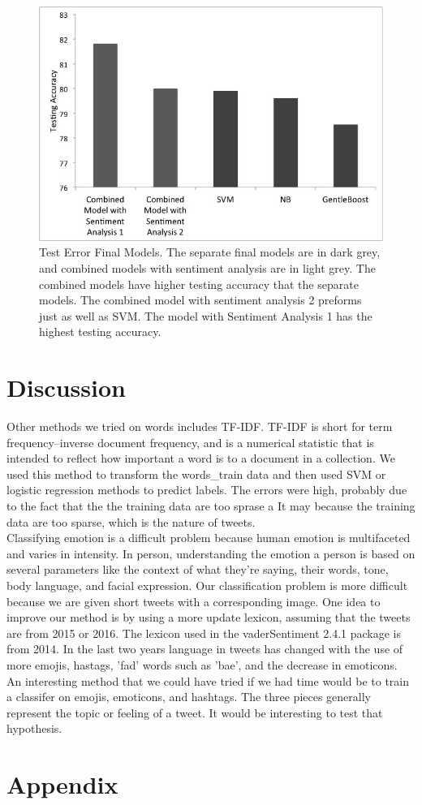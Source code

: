 \documentclass[]{article}
\begin{document}
\begin{figure}
	\centering
  \includegraphics[scale=0.4]{FinalGraph.jpg}
  \caption{Test Error Final Models. The separate final models are in dark grey, and combined models with sentiment analysis are in light grey. The combined models have higher testing accuracy that the separate models. The combined model with sentiment analysis 2 preforms just as well as SVM. The model with Sentiment Analysis 1 has the highest testing accuracy.}
  \label{fig:Test Error}
\end{figure}

\section{Discussion}

Other methods we tried on words includes TF-IDF. TF-IDF is short for term frequency–inverse document frequency, and is a numerical statistic that is intended to reflect how important a word is to a document in a collection. We used this method to transform the words\_train data and then used SVM or logistic regression methods to predict labels. The errors were high, probably due to the fact that the the training data are too sprase a It may because the training data are too sparse, which is the nature of tweets.  \\

Classifying emotion is a difficult problem because human emotion is multifaceted and varies in intensity. In person, understanding the emotion a person is based on several parameters like the context of what they're saying, their words, tone, body language, and facial expression. Our classification problem is more difficult because we are given short tweets with a corresponding image. One idea to improve our method is by using a more update lexicon, assuming that the tweets are from 2015 or 2016. The lexicon used in the vaderSentiment 2.4.1 package is from 2014. In the last two years language in tweets has changed with the use of more emojis, hastags, 'fad' words such as 'bae', and the decrease in emoticons. An interesting method that we could have tried if we had time would be to train a classifer on emojis, emoticons, and hashtags. The three pieces generally represent the topic or feeling of a tweet. It would be interesting to test that hypothesis. 
\section{Appendix}


\end{document}
